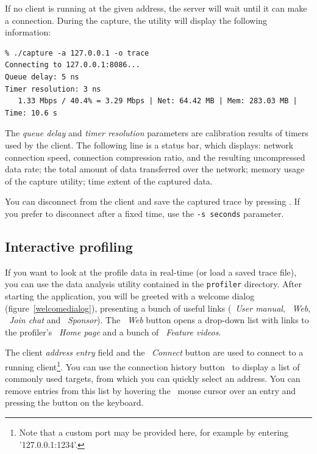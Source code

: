 \documentclass[hidelinks,titlepage,a4paper]{article}
\begin{document}
If no client is running at the given address, the server will wait until it can make a connection. During the capture, the utility will display the following information:

\begin{verbatim}
% ./capture -a 127.0.0.1 -o trace
Connecting to 127.0.0.1:8086...
Queue delay: 5 ns
Timer resolution: 3 ns
   1.33 Mbps / 40.4% = 3.29 Mbps | Net: 64.42 MB | Mem: 283.03 MB | Time: 10.6 s
\end{verbatim}

The \emph{queue delay} and \emph{timer resolution} parameters are calibration results of timers used by the client. The following line is a status bar, which displays: network connection speed, connection compression ratio, and the resulting uncompressed data rate; the total amount of data transferred over the network; memory usage of the capture utility; time extent of the captured data.

You can disconnect from the client and save the captured trace by pressing . If you prefer to disconnect after a fixed time, use the \texttt{-s seconds} parameter.

\subsection{Interactive profiling}
\label{interactiveprofiling}

If you want to look at the profile data in real-time (or load a saved trace file), you can use the data analysis utility contained in the \texttt{profiler} directory. After starting the application, you will be greeted with a welcome dialog (figure~\ref{welcomedialog}), presenting a bunch of useful links (\faBook{}~\emph{User manual}, \faGlobeAmericas{}~\emph{Web}, \faComment~\emph{Join chat} and \faHeart{}~\emph{Sponsor}). The \faGlobeAmericas{}~\emph{Web} button opens a drop-down list with links to the profiler's \emph{\faHome{}~Home page} and a bunch of \emph{\faVideo{}~Feature videos}.

The client \emph{address entry} field and the \faWifi{}~\emph{Connect} button are used to connect to a running client\footnote{Note that a custom port may be provided here, for example by entering '127.0.0.1:1234'.}. You can use the connection history button~\faCaretDown{} to display a list of commonly used targets, from which you can quickly select an address. You can remove entries from this list by hovering the \faMousePointer{}~mouse cursor over an entry and pressing the \keys{\del} button on the keyboard.
\end{document}
